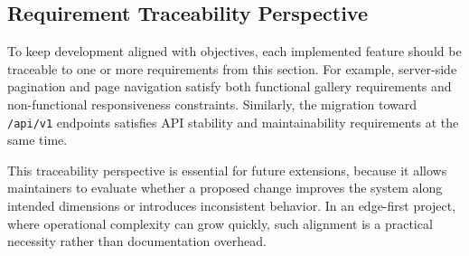 \subsection{Requirement Traceability Perspective}
To keep development aligned with objectives, each implemented feature should be traceable to one or more requirements from this section. For example, server-side pagination and page navigation satisfy both functional gallery requirements and non-functional responsiveness constraints. Similarly, the migration toward \texttt{/api/v1} endpoints satisfies API stability and maintainability requirements at the same time.

This traceability perspective is essential for future extensions, because it allows maintainers to evaluate whether a proposed change improves the system along intended dimensions or introduces inconsistent behavior. In an edge-first project, where operational complexity can grow quickly, such alignment is a practical necessity rather than documentation overhead.
